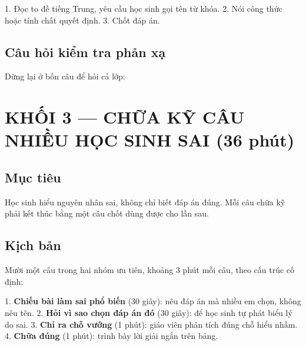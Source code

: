 \documentclass[11pt, a4paper]{article}
\begin{document}
1. Đọc to đề tiếng Trung, yêu cầu học sinh gọi tên từ khóa.
2. Nói công thức hoặc tính chất quyết định.
3. Chốt đáp án.

\subsection{Câu hỏi kiểm tra phản xạ}

Dừng lại ở bốn câu để hỏi cả lớp:


\section{KHỐI 3 — CHỮA KỸ CÂU NHIỀU HỌC SINH SAI (36 phút)}

\subsection{Mục tiêu}

Học sinh hiểu nguyên nhân sai, không chỉ biết đáp án đúng. Mỗi câu chữa kỹ phải kết thúc bằng một câu chốt dùng được cho lần sau.

\subsection{Kịch bản}

Mười một câu trong hai nhóm ưu tiên, khoảng 3 phút mỗi câu, theo cấu trúc cố định:

1. \textbf{Chiếu bài làm sai phổ biến} (30 giây): nêu đáp án mà nhiều em chọn, không nêu tên.
2. \textbf{Hỏi vì sao chọn đáp án đó} (30 giây): để học sinh tự phát biểu lý do sai.
3. \textbf{Chỉ ra chỗ vướng} (1 phút): giáo viên phân tích đúng chỗ hiểu nhầm.
4. \textbf{Chữa đúng} (1 phút): trình bày lời giải ngắn trên bảng.
\end{document}
